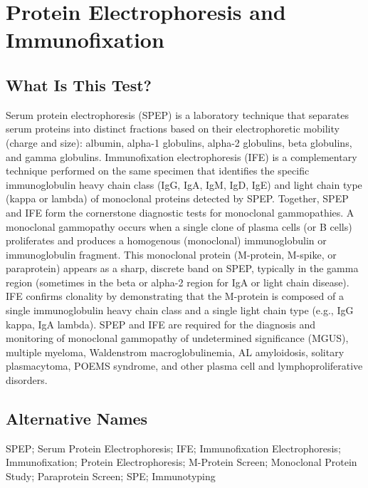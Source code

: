 \chapter{Protein Electrophoresis and Immunofixation}

\section*{What Is This Test?}
Serum protein electrophoresis (SPEP) is a laboratory technique that separates serum proteins into distinct fractions based on their electrophoretic mobility (charge and size): albumin, alpha-1 globulins, alpha-2 globulins, beta globulins, and gamma globulins. Immunofixation electrophoresis (IFE) is a complementary technique performed on the same specimen that identifies the specific immunoglobulin heavy chain class (IgG, IgA, IgM, IgD, IgE) and light chain type (kappa or lambda) of monoclonal proteins detected by SPEP. Together, SPEP and IFE form the cornerstone diagnostic tests for monoclonal gammopathies. A monoclonal gammopathy occurs when a single clone of plasma cells (or B cells) proliferates and produces a homogenous (monoclonal) immunoglobulin or immunoglobulin fragment. This monoclonal protein (M-protein, M-spike, or paraprotein) appears as a sharp, discrete band on SPEP, typically in the gamma region (sometimes in the beta or alpha-2 region for IgA or light chain disease). IFE confirms clonality by demonstrating that the M-protein is composed of a single immunoglobulin heavy chain class and a single light chain type (e.g., IgG kappa, IgA lambda). SPEP and IFE are required for the diagnosis and monitoring of monoclonal gammopathy of undetermined significance (MGUS), multiple myeloma, Waldenstrom macroglobulinemia, AL amyloidosis, solitary plasmacytoma, POEMS syndrome, and other plasma cell and lymphoproliferative disorders.

\section*{Alternative Names}
SPEP; Serum Protein Electrophoresis; IFE; Immunofixation Electrophoresis; Immunofixation; Protein Electrophoresis; M-Protein Screen; Monoclonal Protein Study; Paraprotein Screen; SPE; Immunotyping

